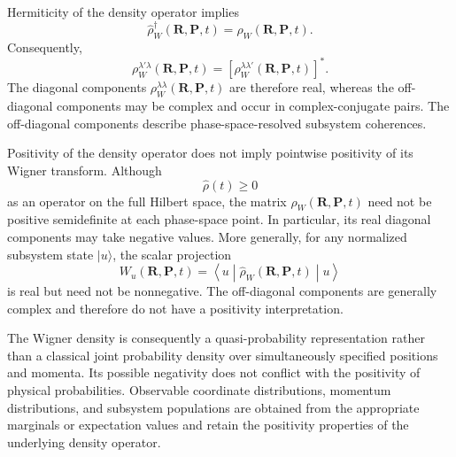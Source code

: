 \documentclass[
  11pt,
  letterpaper,
  onehalfspacing,
  normalmargins,
  equalmargins,
  oneside
]{ut-thesis}
\begin{document}
Hermiticity of the density operator implies
\begin{equation}
\hat\rho_W^\dagger(\mathbf R,\mathbf P,t)
=
\hat\rho_W(\mathbf R,\mathbf P,t).
\label{eq:wigner-hermiticity}
\end{equation}
Consequently,
\begin{equation}
\rho_W^{\lambda'\lambda}(\mathbf R,\mathbf P,t)
=
\left[
\rho_W^{\lambda\lambda'}(\mathbf R,\mathbf P,t)
\right]^\ast .
\label{eq:wigner-component-hermiticity}
\end{equation}
The diagonal components
\(\rho_W^{\lambda\lambda}(\mathbf R,\mathbf P,t)\) are therefore real,
whereas the off-diagonal components may be complex and occur in
complex-conjugate pairs. The off-diagonal components describe
phase-space-resolved subsystem coherences.

Positivity of the density operator does not imply pointwise positivity of its
Wigner transform. Although
\begin{equation}
\hat\rho(t)\geq 0
\end{equation}
as an operator on the full Hilbert space, the matrix
\(\hat\rho_W(\mathbf R,\mathbf P,t)\) need not be positive semidefinite at
each phase-space point. In particular, its real diagonal components may take
negative values. More generally, for any normalized subsystem state
\(\lvert u\rangle\), the scalar projection
\begin{equation}
W_u(\mathbf R,\mathbf P,t)
=
\left\langle
u
\middle|
\hat\rho_W(\mathbf R,\mathbf P,t)
\middle|
u
\right\rangle
\label{eq:projected-wigner-density}
\end{equation}
is real but need not be nonnegative. The off-diagonal components are generally
complex and therefore do not have a positivity interpretation.

The Wigner density is consequently a quasi-probability representation rather
than a classical joint probability density over simultaneously specified
positions and momenta. Its possible negativity does not conflict with the
positivity of physical probabilities. Observable coordinate distributions,
momentum distributions, and subsystem populations are obtained from the
appropriate marginals or expectation values and retain the positivity
properties of the underlying density operator.
\end{document}
